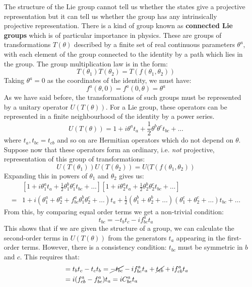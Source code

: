 \documentclass[../main.tex]{subfiles}
\begin{document}
The structure of the Lie group cannot tell us whether the states give a projective representation but it can tell us whether the group has any intrinsically projective representation. There is a kind of group known as \textbf{connected Lie groups} which is of particular importance in physics. These are groups of transformations $T(\theta)$ described by a finite set of real continuous parameters $\theta^a$, with each element of the group connected to the identity by a path which lies in the group. The group multiplication law is in the form:
\[
T(\theta_1)T(\theta_2)=T(f(\theta_1,\theta_2))
\]
Taking $\theta^a=0$ as the coordinates of the identity, we must have:
\[
f^a(\theta,0)=f^a(0,\theta)=\theta^a
\]
As we have said before, the transformations of such groups must be represented by a unitary operator $U(T(\theta))$. For a Lie group, these operators can be represented in a finite neighbourhood of the identity by a power series.
\[
U(T(\theta))=1+i\theta^at_a+\frac{1}{2}\theta^b\theta^ct_{bc}+\dots
\]
where $t_a, t_{bc}=t_{cb}$ and so on are Hermitian operators which do not depend on $\theta$. Suppose now that these operators form an ordinary, i.e. \textit{not} projective, representation of this group of transformations:
\[
U(T(\theta_1))U(T(\theta_2))=U(T(f(\theta_1,\theta_2))
\]
Expanding this in powers of $\theta_1$ and $\theta_2$ gives us:
\begin{align*}
&\left[1+i\theta_1^at_a+\frac{1}{2}\theta_1^b\theta_1^ct_{bc}+\dots\right]\left[1+i\theta_2^at_a+\frac{1}{2}\theta_2^b\theta_2^ct_{bc}+\dots\right]\\
=&1+i(\theta_1^a+\theta_2^a+f^a_{bc}\theta_1^b\theta_2^c+\dots)t_a+\frac{1}{2}(\theta_1^b+\theta_2^b+\dots)(\theta_1^c+\theta_2^c+\dots)t_{bc}+\dots
\end{align*}
From this, by comparing equal order terms we get a non-trivial condition:
\[
t_{bc}=-t_bt_c-if^a_{bc}t_a
\]
This shows that if we are given the structure of a group, we can calculate the second-order terms in $U(T(\theta))$ from the generators $t_a$ appearing in the first-order terms. However, there is a consistency condition: $t_{bc}$ must be symmetric in $b$ and $c$. This requires that:
\begin{align*}
[t_b,t_c]&=t_bt_c-t_ct_b=\cancel{-t_{bc}}-if^a_{bc}t_a+\cancel{t_{cb}}+if^a_{cb}t_a\\
&=i(f_{cb}^a-f_{bc}^a)t_a=iC_{bc}^at_a
\end{align*}
\end{document}
